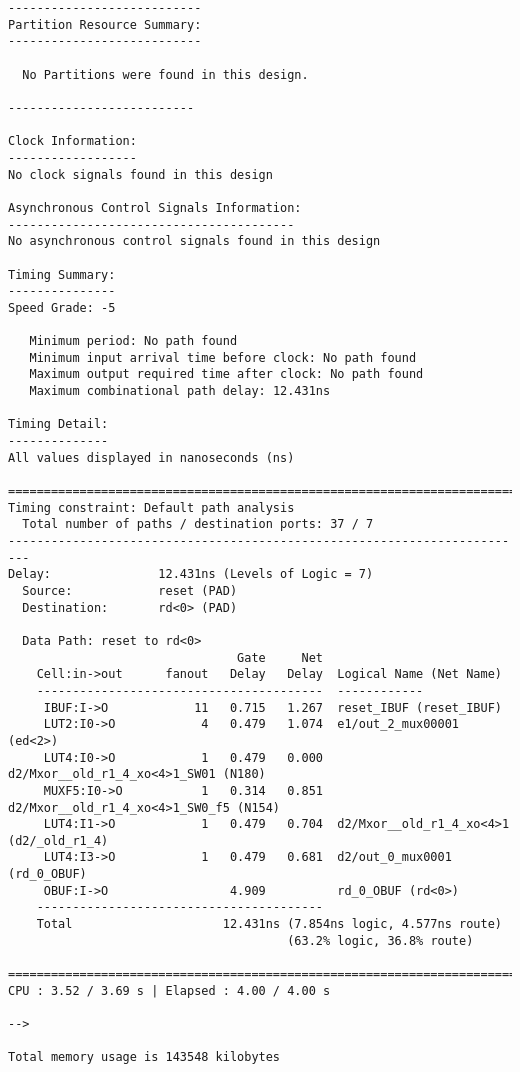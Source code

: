 \documentclass[14pt]{report}
\begin{document}
{\begin{verbatim}
---------------------------
Partition Resource Summary:
---------------------------

  No Partitions were found in this design.

--------------------------

Clock Information:
------------------
No clock signals found in this design

Asynchronous Control Signals Information:
----------------------------------------
No asynchronous control signals found in this design

Timing Summary:
---------------
Speed Grade: -5

   Minimum period: No path found
   Minimum input arrival time before clock: No path found
   Maximum output required time after clock: No path found
   Maximum combinational path delay: 12.431ns

Timing Detail:
--------------
All values displayed in nanoseconds (ns)

=========================================================================
Timing constraint: Default path analysis
  Total number of paths / destination ports: 37 / 7
-------------------------------------------------------------------------
Delay:               12.431ns (Levels of Logic = 7)
  Source:            reset (PAD)
  Destination:       rd<0> (PAD)

  Data Path: reset to rd<0>
                                Gate     Net
    Cell:in->out      fanout   Delay   Delay  Logical Name (Net Name)
    ----------------------------------------  ------------
     IBUF:I->O            11   0.715   1.267  reset_IBUF (reset_IBUF)
     LUT2:I0->O            4   0.479   1.074  e1/out_2_mux00001 (ed<2>)
     LUT4:I0->O            1   0.479   0.000  d2/Mxor__old_r1_4_xo<4>1_SW01 (N180)
     MUXF5:I0->O           1   0.314   0.851  d2/Mxor__old_r1_4_xo<4>1_SW0_f5 (N154)
     LUT4:I1->O            1   0.479   0.704  d2/Mxor__old_r1_4_xo<4>1 (d2/_old_r1_4)
     LUT4:I3->O            1   0.479   0.681  d2/out_0_mux0001 (rd_0_OBUF)
     OBUF:I->O                 4.909          rd_0_OBUF (rd<0>)
    ----------------------------------------
    Total                     12.431ns (7.854ns logic, 4.577ns route)
                                       (63.2% logic, 36.8% route)

=========================================================================
CPU : 3.52 / 3.69 s | Elapsed : 4.00 / 4.00 s
 
--> 

Total memory usage is 143548 kilobytes


\end{verbatim}}
\end{document}
